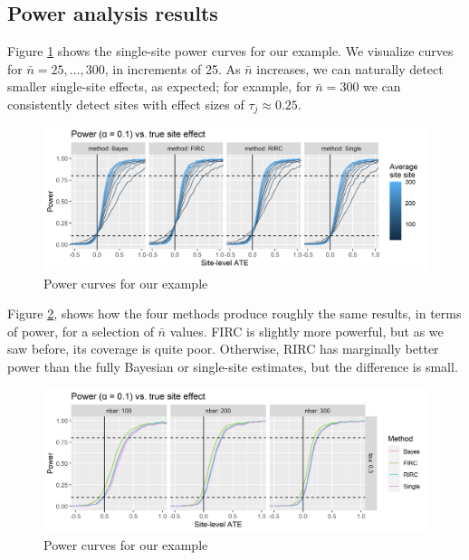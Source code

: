 \documentclass[]{article}
\begin{document}
\subsection{Power analysis results}

Figure \ref{fig:power_plot_ex} shows the single-site power curves for our example. We visualize curves for $\bar{n} = 25, \dots, 300$, in increments of 25.
As $\bar{n}$ increases, we can naturally detect smaller single-site effects, as expected; for example, for $\bar{n} = 300$ we can consistently detect sites with effect sizes of $\tau_j \approx 0.25$.
\begin{figure}[ht]
	\centering
	\includegraphics[width=\textwidth]{power_plot_ex}
	\caption{Power curves for our example}
	\label{fig:power_plot_ex}
\end{figure}

Figure \ref{fig:power_plot_ex2}, shows how the four methods produce roughly the same results, in terms of power, for a selection of $\bar{n}$ values.
FIRC is slightly more powerful, but as we saw before, its coverage is quite poor.
Otherwise, RIRC has marginally better power than the fully Bayesian or single-site estimates, but the difference is small.
\begin{figure}[ht]
	\centering
	\includegraphics[width=\textwidth]{power_plot_ex2}
	\caption{Power curves for our example}
	\label{fig:power_plot_ex2}
\end{figure}
\end{document}
